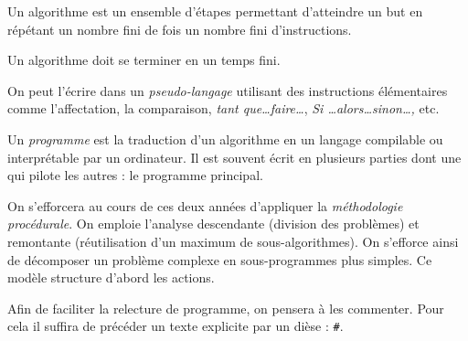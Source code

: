 \begin{defi}[Algorithme]
Un algorithme est un ensemble d'étapes permettant d'atteindre un but en répétant un nombre fini de fois un nombre fini d'instructions.
\end{defi}
Un algorithme doit se terminer en un temps fini.\par On peut l'écrire dans un \emph{pseudo-langage} utilisant des instructions élémentaires comme l'affectation, la comparaison, \emph{tant que\dots faire\dots}, \emph{Si \dots alors\dots sinon\dots,} etc.\par
Un \emph{programme} est la traduction d'un algorithme en un langage compilable ou interprétable par un ordinateur. Il est souvent écrit en plusieurs parties dont une qui pilote les autres : le programme principal.\par
On s'efforcera au cours de ces deux années d'appliquer la \emph{méthodologie procédurale}. On emploie l'analyse descendante (division des problèmes) et remontante (réutilisation d'un maximum de sous-algorithmes). On s'efforce ainsi de décomposer un problème complexe en sous-programmes plus simples. Ce modèle structure d'abord les actions.\par
Afin de faciliter la relecture de programme, on pensera à les commenter. Pour cela il suffira de précéder un texte explicite par un dièse : \lstinline?#?.
